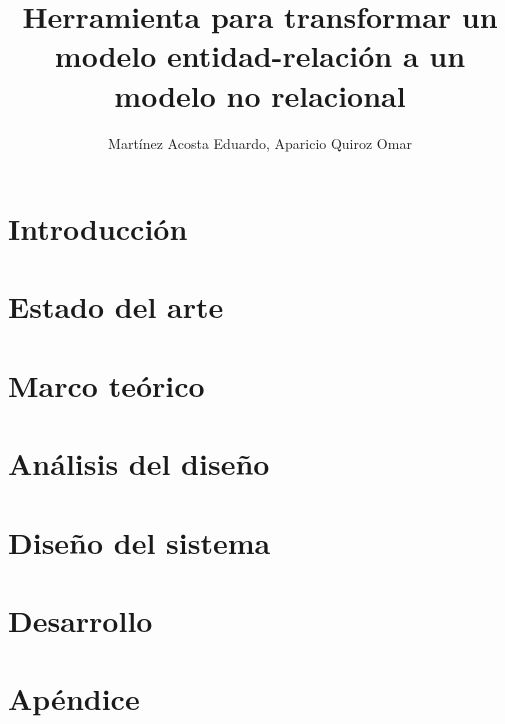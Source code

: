 \documentclass[12pt, a4paper]{report}
\title{Herramienta para transformar un modelo entidad-relación a un modelo no relacional}
\author{Martínez Acosta Eduardo, Aparicio Quiroz Omar}
\theoremstyle{definition}
\theoremstyle{remark}
\begin{document}

\tableofcontents
\listoffigures
\listoftables


\chapter{Introducción}

\chapter{Estado del arte}

\chapter{Marco teórico}

\chapter{Análisis del diseño}

\chapter{Diseño del sistema}

\chapter{Desarrollo}

\appendix
\chapter{Apéndice}


\printbibliography
\end{document}
